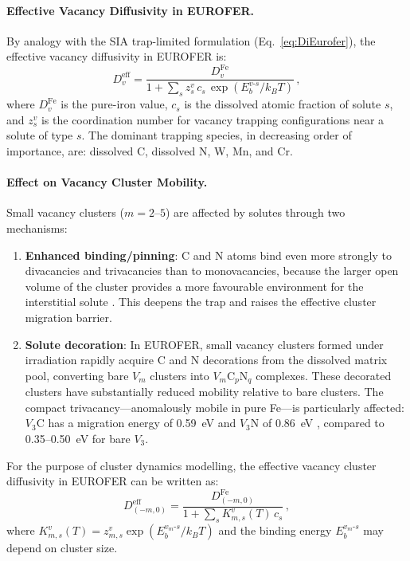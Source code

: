 \documentclass[pdflatex,sn-basic]{sn-jnl} %
\begin{document}
\paragraph{Effective Vacancy Diffusivity in EUROFER.}

By analogy with the SIA trap-limited formulation (Eq.~\ref{eq:DiEurofer}), the
effective vacancy diffusivity in EUROFER is:
\begin{equation}\label{eq:DvEurofer}
    \boxed{D_v^{\mathrm{eff}}
    = \frac{D_v^{\mathrm{Fe}}}
           {1 + \displaystyle\sum_s z_s^v\,c_s\,\exp(E_b^{v\text{-}s}/k_BT)}\,,}
\end{equation}
where $D_v^{\mathrm{Fe}}$ is the pure-iron value, $c_s$ is the dissolved
atomic fraction of solute $s$, and $z_s^v$ is the coordination number for
vacancy trapping configurations near a solute of type $s$. The dominant
trapping species, in decreasing order of importance, are: dissolved C, dissolved
N, W, Mn, and Cr.

\paragraph{Effect on Vacancy Cluster Mobility.}

Small vacancy clusters ($m = 2$--$5$) are affected by solutes through two
mechanisms:
\begin{enumerate}
\item \textbf{Enhanced binding/pinning}: C and N atoms bind even more strongly
to divacancies and trivacancies than to monovacancies, because the larger open
volume of the cluster provides a more favourable environment for the
interstitial solute \citep{Domain2004,Schuler2015}. This deepens the trap and
raises the effective cluster migration barrier.

\item \textbf{Solute decoration}: In EUROFER, small vacancy clusters formed
under irradiation rapidly acquire C and N decorations from the dissolved matrix
pool, converting bare $V_m$ clusters into $V_m$C$_p$N$_q$ complexes. These
decorated clusters have substantially reduced mobility relative to bare
clusters. The compact trivacancy---anomalously mobile in pure Fe---is
particularly affected: $V_3$C has a migration energy of 0.59~eV and $V_3$N of
0.86~eV \citep{Schuler2015}, compared to 0.35--0.50~eV for bare $V_3$.
\end{enumerate}

For the purpose of cluster dynamics modelling, the effective vacancy cluster
diffusivity in EUROFER can be written as:
\begin{equation}\label{eq:DvmEurofer}
    D_{(-m,0)}^{\mathrm{eff}}
    = \frac{D_{(-m,0)}^{\mathrm{Fe}}}
           {1 + \displaystyle\sum_s K_{m,s}^v(T)\,c_s}\,,
\end{equation}
where $K_{m,s}^v(T) = z_{m,s}^v \exp(E_b^{v_m\text{-}s}/k_BT)$ and the
binding energy $E_b^{v_m\text{-}s}$ may depend on cluster size.
\end{document}
